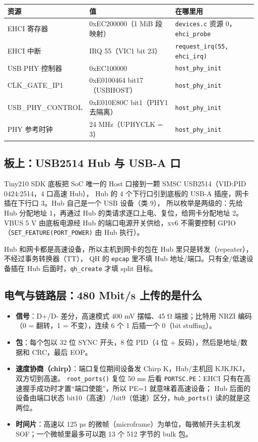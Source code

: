 \documentclass[UTF8,zihao=-4,fontset=none]{ctexart}
\newcommand{\fn}[1]{\texttt{#1}}
\begin{document}
\begin{table}[H]\centering\small
\begin{tabular}{lll}
\toprule
资源 & 值 & 在哪里用 \\ \midrule
EHCI 寄存器 & 0xEC200000（1 MiB 段映射） & \fn{devices.c} 资源 0，\fn{ehci\_probe} \\
EHCI 中断 & IRQ 55（VIC1 bit 23） & \fn{request\_irq(55, ehci\_irq)} \\
USB PHY 控制器 & 0xEC100000 & \fn{host\_phy\_init} \\
CLK\_GATE\_IP1 & 0xE0100464 bit17（USBHOST） & \fn{host\_phy\_init} \\
USB\_PHY\_CONTROL & 0xE010E80C bit1（PHY1 去隔离） & \fn{host\_phy\_init} \\
PHY 参考时钟 & 24 MHz（UPHYCLK = 3） & \fn{host\_phy\_init} \\
\bottomrule
\end{tabular}
\end{table}

\subsection{板上：USB2514 Hub 与 USB-A 口}

Tiny210 SDK 底板把 SoC 唯一的 Host 口接到一颗 SMSC USB2514（VID:PID 0424:2514，4 口高速 Hub），
Hub 的 4 个下行口引到底板的 USB-A 插座，网卡插在下行口 3。Hub 自己是一个 USB 设备（类 9），
所以枚举是两级的：先给 Hub 分配地址 1，再通过 Hub 的类请求逐口上电、复位，给网卡分配地址 2。
VBUS 5 V 由底板电源经 Hub 的端口电源开关供给，xv6 不需要控制 GPIO（\fn{SET\_FEATURE(PORT\_POWER)} 由 Hub 执行）。

Hub 和网卡都是高速设备，所以主机到网卡的包在 Hub 里只是转发（repeater），不经过事务转换器（TT），
QH 的 \fn{epcap} 里不填 Hub 地址/端口。只有全/低速设备插在 Hub 后面时，\fn{qh\_create} 才填 split 目标。

\subsection{电气与链路层：480 Mbit/s 上传的是什么}

\begin{itemize}[leftmargin=2em,itemsep=0pt]
\item \textbf{信号}：D+/D- 差分，高速模式 400 mV 摆幅、45 Ω 端接；比特用 NRZI 编码（0 = 翻转，1 = 不变），连续 6 个 1 后插一个 0（bit stuffing）。
\item \textbf{包}：每个包以 32 位 SYNC 开头，8 位 PID（4 位 + 反码），然后是地址/数据和 CRC，最后 EOP。
\item \textbf{速度协商（chirp）}：端口复位期间设备发 Chirp K，Hub/主机回 KJKJKJ，双方切到高速。
  \fn{root\_ports()} 复位 50 ms 后看 \fn{PORTSC.PE}：EHCI 只有在高速握手成功时才置“端口使能”，所以 PE=1 就意味着高速设备；
  Hub 后面的设备由端口状态 bit10（高速）/bit9（低速）区分，\fn{hub\_ports()} 读的就是这两位。
\item \textbf{时间片}：高速以 125 µs 的微帧（microframe）为单位，每微帧开头主机发 SOF；一个微帧里最多可以跑 13 个 512 字节的 bulk 包。
\end{itemize}
\end{document}
